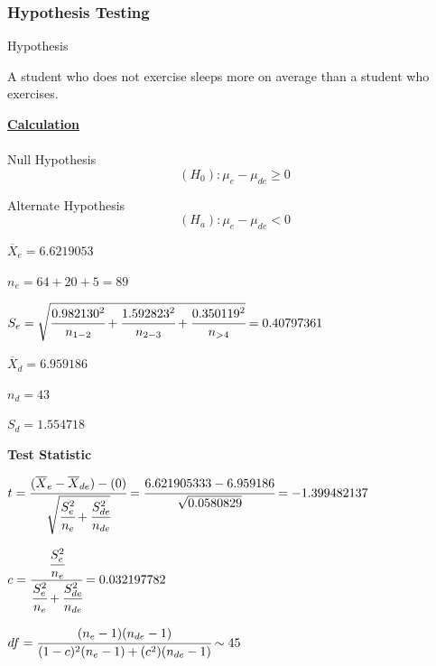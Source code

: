 \documentclass[11pt,]{beamer}
\begin{document}
\begin{frame}
\frametitle{Hypothesis Testing}

\begin{block}{Hypothesis}

A student who does not exercise sleeps more on average than a student who exercises. 

\end{block}

    \textbf{\underline{Calculation}}\\
    \\
    Null Hypothesis
    \begin{equation}
         (H_0) :  \mu_{e} - \mu_{de} \geq 0
    \end{equation}
    
    \bigskip
    
    Alternate Hypothesis
    \begin{equation}
        (H_a) : \mu_{e} - \mu_{de} < 0
    \end{equation}

\end{frame}

\begin{frame}

$\overline{X}_{e} = 6.6219053$

\bigskip

$n_{e} = 64 + 20 + 5 = 89$

\bigskip

$S_{e} = \sqrt{\cfrac{0.982130^2}{n_{1-2}}+ \cfrac{1.592823^2}{n_{2-3}} + \cfrac{0.350119^2}{n_{>4}}} = 0.40797361$

\bigskip

$\overline{X}_{d} = 6.959186$

\bigskip

$n_{d} = 43$

\bigskip

$S_{d} = 1.554718$

\end{frame}

\begin{frame}

    \textbf{Test Statistic}
    
    \bigskip
    
    $ t = \cfrac{(\overline{X}_{e} - \overline{X}_{de}) - (0)}{\sqrt{\cfrac{S_{e}^{2}}{n_{e}} + \cfrac{S_{de}^{2}}{n_{de}}}} = \cfrac{6.621905333 - 6.959186}{\sqrt{0.0580829}} = -1.399482137$
    
    \bigskip
    
    $ c= \cfrac{\cfrac{S_{e}^{2}}{n_{e}}}{\cfrac{S_{e}^{2}}{n_{e}} + \cfrac{S_{de}^{2}}{n_{de}}} = 0.032197782$
    
    \bigskip
    
    $df = \cfrac{(n_{e} - 1)(n_{de} - 1)}{(1 - c)^{2}(n_{e}- 1) + (c^2)(n_{de} - 1)} \sim 45$
    
\end{frame}
\end{document}

